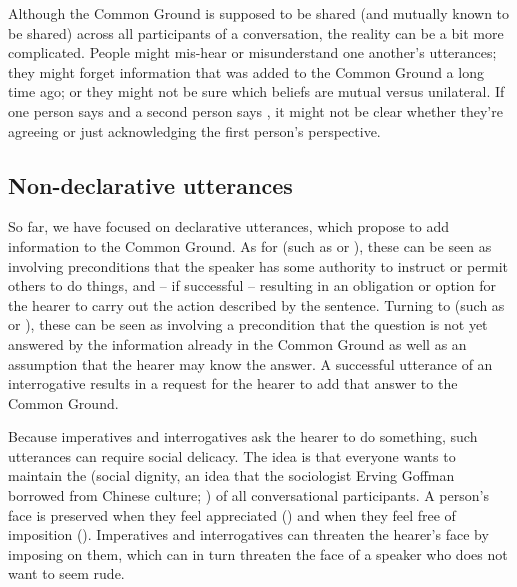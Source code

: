 Although the Common Ground is supposed to be shared (and mutually known to be shared) across all participants of a conversation, the reality can be a bit more complicated.  People might mis-hear or misunderstand one another's utterances; they might forget information that was added to the Common Ground a long time ago; or they might not be sure which beliefs are mutual versus unilateral.  If one person says  and a second person says , it might not be clear whether they're agreeing or just acknowledging the first person's perspective. 


\subsection{Non-declarative utterances}

So far, we have focused on declarative utterances, which propose to add information to the Common Ground.  As for  (such as  or ),  these can be seen as involving preconditions that the speaker has some authority to instruct or permit others to do things, and -- if successful -- resulting in an obligation or option for the hearer to carry out the action described by the sentence.  Turning to  (such as  or ), these can be seen as involving a precondition that the question is not yet answered by the information already in the Common Ground as well as an assumption that the hearer may know the answer.  A successful utterance of an interrogative results in a request for the hearer to add that answer to the Common Ground.

Because imperatives and interrogatives ask the hearer to do something, such utterances can  require social delicacy.  The idea is that everyone wants to maintain the  (social dignity, an idea that the sociologist Erving Goffman borrowed from Chinese culture; \citealt{Goffman:1967}) of all conversational participants.  A person's face is preserved when they feel appreciated () and when they feel free of imposition ().
 Imperatives and interrogatives can threaten the hearer's face by imposing on them, which can in turn threaten the face of a speaker who does not want to seem rude.  
 
